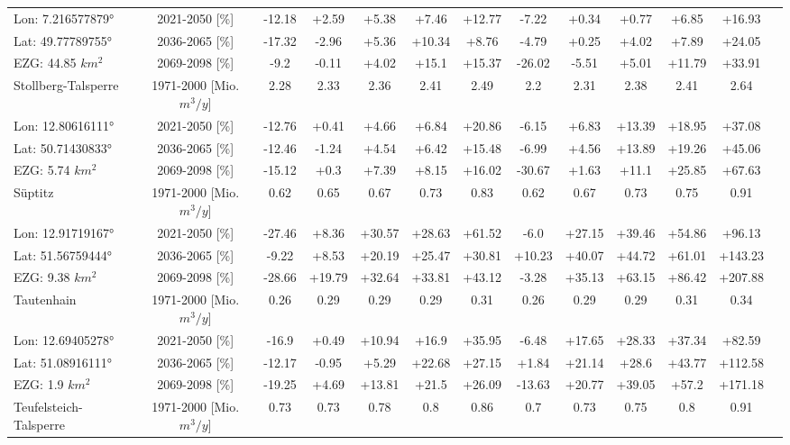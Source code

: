 \begin{longtable}{@{\extracolsep{\fill}}lc|ccccc||cccccc}
\cline{2-13} 
Lon: 7.216577879° & 2021-2050 [\%]  & -12.18 & +2.59 & +5.38 & +7.46 & +12.77 & -7.22 & +0.34 & +0.77 & +6.85 & +16.93 & \\ 
Lat: 49.77789755° & 2036-2065 [\%]  & -17.32 & -2.96 & +5.36 & +10.34 & +8.76 & -4.79 & +0.25 & +4.02 & +7.89 & +24.05 & \\ 
EZG: 44.85 $km^2$ & 2069-2098 [\%]  & -9.2 & -0.11 & +4.02 & +15.1 & +15.37 & -26.02 & -5.51 & +5.01 & +11.79 & +33.91 & \\ 
\hline 
Stollberg-Talsperre & 1971-2000 [Mio. $m^3/y$]  & 2.28 & 2.33 & 2.36 & 2.41 & 2.49 & 2.2 & 2.31 & 2.38 & 2.41 & 2.64 & \\ 
\cline{2-13} 
Lon: 12.80616111° & 2021-2050 [\%]  & -12.76 & +0.41 & +4.66 & +6.84 & +20.86 & -6.15 & +6.83 & +13.39 & +18.95 & +37.08 & \\ 
Lat: 50.71430833° & 2036-2065 [\%]  & -12.46 & -1.24 & +4.54 & +6.42 & +15.48 & -6.99 & +4.56 & +13.89 & +19.26 & +45.06 & \\ 
EZG: 5.74 $km^2$ & 2069-2098 [\%]  & -15.12 & +0.3 & +7.39 & +8.15 & +16.02 & -30.67 & +1.63 & +11.1 & +25.85 & +67.63 & \\ 
\hline 
Süptitz & 1971-2000 [Mio. $m^3/y$]  & 0.62 & 0.65 & 0.67 & 0.73 & 0.83 & 0.62 & 0.67 & 0.73 & 0.75 & 0.91 & \\ 
\cline{2-13} 
Lon: 12.91719167° & 2021-2050 [\%]  & -27.46 & +8.36 & +30.57 & +28.63 & +61.52 & -6.0 & +27.15 & +39.46 & +54.86 & +96.13 & \\ 
Lat: 51.56759444° & 2036-2065 [\%]  & -9.22 & +8.53 & +20.19 & +25.47 & +30.81 & +10.23 & +40.07 & +44.72 & +61.01 & +143.23 & \\ 
EZG: 9.38 $km^2$ & 2069-2098 [\%]  & -28.66 & +19.79 & +32.64 & +33.81 & +43.12 & -3.28 & +35.13 & +63.15 & +86.42 & +207.88 & \\ 
\hline 
Tautenhain & 1971-2000 [Mio. $m^3/y$]  & 0.26 & 0.29 & 0.29 & 0.29 & 0.31 & 0.26 & 0.29 & 0.29 & 0.31 & 0.34 & \\ 
\cline{2-13} 
Lon: 12.69405278° & 2021-2050 [\%]  & -16.9 & +0.49 & +10.94 & +16.9 & +35.95 & -6.48 & +17.65 & +28.33 & +37.34 & +82.59 & \\ 
Lat: 51.08916111° & 2036-2065 [\%]  & -12.17 & -0.95 & +5.29 & +22.68 & +27.15 & +1.84 & +21.14 & +28.6 & +43.77 & +112.58 & \\ 
EZG: 1.9 $km^2$ & 2069-2098 [\%]  & -19.25 & +4.69 & +13.81 & +21.5 & +26.09 & -13.63 & +20.77 & +39.05 & +57.2 & +171.18 & \\ 
\hline 
Teufelsteich-Talsperre & 1971-2000 [Mio. $m^3/y$]  & 0.73 & 0.73 & 0.78 & 0.8 & 0.86 & 0.7 & 0.73 & 0.75 & 0.8 & 0.91 & \\ 

\end{longtable}
